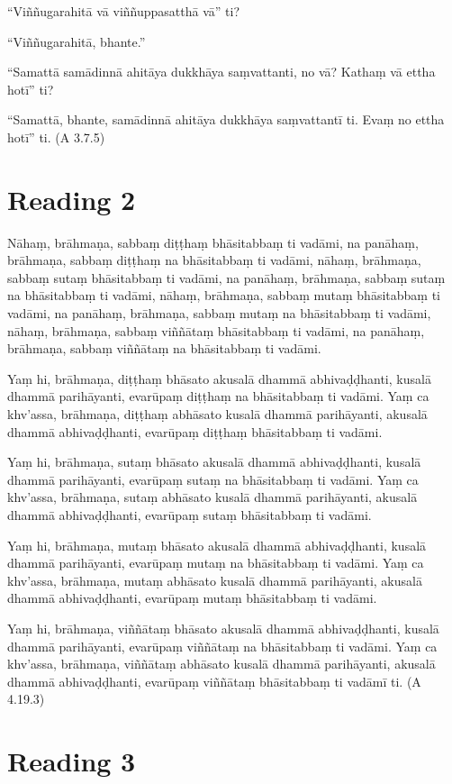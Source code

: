 “Viññugarahitā vā viññuppasatthā vā” ti?

“Viññugarahitā, bhante.”

“Samattā samādinnā ahitāya dukkhāya saṃvattanti, no vā? Kathaṃ vā ettha hotī” ti?

“Samattā, bhante, samādinnā ahitāya dukkhāya saṃvattantī ti. Evaṃ no ettha hotī” ti. (A 3.7.5)

\section*{Reading 2}

Nāhaṃ, brāhmaṇa, sabbaṃ diṭṭhaṃ bhāsitabbaṃ ti vadāmi, na panāhaṃ, brāhmaṇa, sabbaṃ diṭṭhaṃ na bhāsitabbaṃ ti vadāmi, nāhaṃ, brāhmaṇa, sabbaṃ sutaṃ bhāsitabbaṃ ti vadāmi, na panāhaṃ, brāhmaṇa, sabbaṃ sutaṃ na bhāsitabbaṃ ti vadāmi, nāhaṃ, brāhmaṇa, sabbaṃ mutaṃ bhāsitabbaṃ ti vadāmi, na panāhaṃ, brāhmaṇa, sabbaṃ mutaṃ na bhāsitabbaṃ ti vadāmi, nāhaṃ, brāhmaṇa, sabbaṃ viññātaṃ bhāsitabbaṃ ti vadāmi, na panāhaṃ, brāhmaṇa, sabbaṃ viññātaṃ na bhāsitabbaṃ ti vadāmi.

Yaṃ hi, brāhmaṇa, diṭṭhaṃ bhāsato akusalā dhammā abhivaḍḍhanti, kusalā dhammā parihāyanti, evarūpaṃ diṭṭhaṃ na bhāsitabbaṃ ti vadāmi. Yaṃ ca khv’assa, brāhmaṇa, diṭṭhaṃ abhāsato kusalā dhammā parihāyanti, akusalā dhammā abhivaḍḍhanti, evarūpaṃ diṭṭhaṃ bhāsitabbaṃ ti vadāmi.

Yaṃ hi, brāhmaṇa, sutaṃ bhāsato akusalā dhammā abhivaḍḍhanti, kusalā dhammā parihāyanti, evarūpaṃ sutaṃ na bhāsitabbaṃ ti vadāmi. Yaṃ ca khv’assa, brāhmaṇa, sutaṃ abhāsato kusalā dhammā parihāyanti, akusalā dhammā abhivaḍḍhanti, evarūpaṃ sutaṃ bhāsitabbaṃ ti vadāmi.

Yaṃ hi, brāhmaṇa, mutaṃ bhāsato akusalā dhammā abhivaḍḍhanti, kusalā dhammā parihāyanti, evarūpaṃ mutaṃ na bhāsitabbaṃ ti vadāmi. Yaṃ ca khv’assa, brāhmaṇa, mutaṃ abhāsato kusalā dhammā parihāyanti, akusalā dhammā abhivaḍḍhanti, evarūpaṃ mutaṃ bhāsitabbaṃ ti vadāmi.

Yaṃ hi, brāhmaṇa, viññātaṃ bhāsato akusalā dhammā abhivaḍḍhanti, kusalā dhammā parihāyanti, evarūpaṃ viññātaṃ na bhāsitabbaṃ ti vadāmi. Yaṃ ca khv’assa, brāhmaṇa, viññātaṃ abhāsato kusalā dhammā parihāyanti, akusalā dhammā abhivaḍḍhanti, evarūpaṃ viññātaṃ bhāsitabbaṃ ti vadāmī ti. (A 4.19.3)

\section*{Reading 3}

